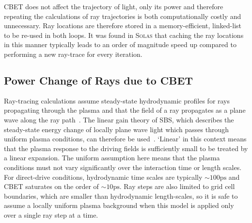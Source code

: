 \ac{CBET} does not affect the trajectory of light, only its power and therefore repeating the calculations of ray trajectories is both computationally costly and unnecessary.
Ray locations are therefore stored in a memory-efficient, linked-list to be re-used in both loops.
It was found in \textsc{Solas} that caching the ray locations in this manner typically leads to an order of magnitude speed up compared to performing a new ray-trace for every iteration.

\subsection{Power Change of Rays due to CBET}%
\label{sec:SOLAS_ray_power_change}

Ray-tracing calculations assume steady-state hydrodynamic profiles for rays propagating through the plasma and that the field of a ray propagates as a plane wave along the ray path~\cite{ding_identify_2020}.
The linear gain theory of \ac{SBS}, which describes the steady-state energy change of locally plane wave light which passes through uniform plasma conditions, can therefore be used~\cite{randall_theory_1981,myatt_wave-based_2017}.
`Linear' in this context means that the plasma response to the driving fields is sufficiently small to be treated by a linear expansion.
The uniform assumption here means that the plasma conditions must not vary significantly over the interaction time or length scales.
For direct-drive conditions, hydrodynamic time scales are typically $\sim100 \text{ps}$ and \ac{CBET} saturates on the order of $\sim10 \text{ps}$.
Ray steps are also limited to grid cell boundaries, which are smaller than hydrodynamic length-scales, so it is safe to assume a locally uniform plasma background when this model is applied only over a single ray step at a time.

